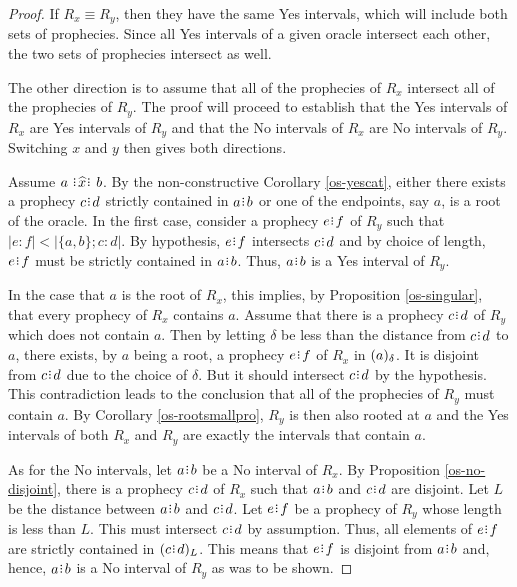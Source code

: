 \documentclass[12pt]{article}
\begin{document}
\begin{proof}
    If $R_x \equiv R_y$, then they have the same Yes intervals, which will include both sets of prophecies. Since all Yes intervals of a given oracle intersect each other, the two sets of prophecies intersect as well. 
    
    The other direction is to assume that all of the prophecies of $R_x$ intersect all of the prophecies of $R_y$. The proof will proceed to establish that the Yes intervals of $R_x$ are Yes intervals of $R_y$ and that the No intervals of $R_x$ are No intervals of $R_y$. Switching $x$ and $y$ then gives both directions.  

    Assume $a \xora b$. By the non-constructive Corollary \ref{os-yescat}, either there exists a prophecy $c\rint d$ strictly contained in $a\rint b$ or one of the endpoints, say $a$, is a root of the oracle. In the first case, consider a prophecy $e\rint f$ of $R_y$ such that $|e:f| < |\{a,b\}; c:d|$. By hypothesis, $e\rint f$ intersects $c\rint d$ and by choice of length, $e\rint f$ must be strictly contained in $a\rint b$. Thus, $a\rint b$ is a Yes interval of $R_y$.

    In the case that $a$ is the root of $R_x$, this implies, by Proposition \ref{os-singular}, that every prophecy of $R_x$ contains $a$. Assume that there is a prophecy $c\rint d$ of $R_y$ which does not contain $a$. Then by letting $\delta$ be less than the distance from $c\rint d$ to $a$, there exists, by $a$ being a root, a prophecy $e\rint f$ of $R_x$ in $(a)_{\delta}$. It is disjoint from $c\rint d$ due to the choice of $\delta$. But it should intersect $c\rint d$ by the hypothesis. This contradiction leads to the conclusion that all of the prophecies of $R_y$ must contain $a$. By Corollary \ref{os-rootsmallpro}, $R_y$ is then also rooted at $a$  and the Yes intervals of both $R_x$ and $R_y$ are exactly the intervals that contain $a$. 
    
    As for the No intervals, let $a\rint b$ be a No interval of $R_x$. By Proposition \ref{os-no-disjoint}, there is a prophecy $c\rint d$ of $R_x$ such that $a\rint b$ and $c\rint d$ are disjoint. Let $L$ be the distance between $a\rint b$ and $c\rint d$. Let $e\rint f$ be a prophecy of $R_y$ whose length is less than $L$. This must intersect $c\rint d$ by assumption. Thus, all elements of $e\rint f$ are strictly contained in $\halo[L]{c\rint d}$. This means that $e\rint f$ is disjoint from $a\rint b$ and, hence, $a\rint b$ is a No interval of $R_y$ as was to be shown. 
\end{proof} 
\end{document}
